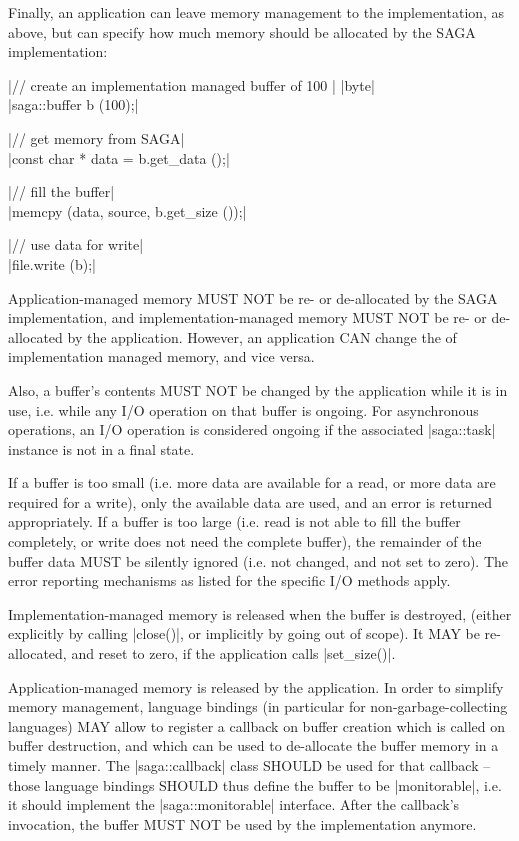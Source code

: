  Finally, an application can leave memory management to the
 implementation, as above, but can specify how much memory
 should be allocated by the SAGA implementation:
 
   \shift |// create an implementation managed buffer of 100 |
          |byte|\\
   \shift |saga::buffer b (100);|
 
   \upp
   \shift |// get memory from SAGA|\\
   \shift |const char * data = b.get_data ();|
 
   \upp
   \shift |// fill the buffer|\\
   \shift |memcpy (data, source, b.get_size ());|
 
   \upp
   \shift |// use data for write|\\
   \shift |file.write (b);|
 
 Application-managed memory MUST NOT be re- or de-allocated by
 the SAGA implementation, and implementation-managed memory MUST
 NOT be re- or de-allocated by the application.  However, an
 application CAN change the  of implementation
 managed memory, and vice versa.
 
 Also, a buffer's contents MUST NOT be changed by the application
 while it is in use, i.e. while any I/O operation on that buffer
 is ongoing.  For asynchronous operations, an I/O operation is
 considered ongoing if the associated |saga::task| instance is
 not in a final state.
 
 If a buffer is too small (i.e. more data are available for a
 read, or more data are required for a write), only the
 available data are used, and an error is returned
 appropriately.  If a buffer is too large (i.e. read is not able
 to fill the buffer completely, or write does not need the
 complete buffer), the remainder of the buffer data MUST be
 silently ignored (i.e. not changed, and not set to zero).  The
 error reporting mechanisms as listed for the specific I/O
 methods apply.
 
 Implementation-managed memory is released when the buffer is
 destroyed, (either explicitly by calling |close()|, or
 implicitly by going out of scope).  It MAY be re-allocated,
 and reset to zero, if the application calls |set_size()|.
 
 Application-managed memory is released by the application.  In
 order to simplify memory management, language bindings (in
 particular for non-garbage-collecting languages) MAY allow to
 register a callback on buffer creation which is called on
 buffer destruction, and which can be used to de-allocate the
 buffer memory in a timely manner.  The |saga::callback| class
 SHOULD be used for that callback -- those language bindings
 SHOULD thus define the buffer to be |monitorable|, i.e. it
 should implement the |saga::monitorable| interface.  After the
 callback's invocation, the buffer MUST NOT be used by the
 implementation anymore.
 
